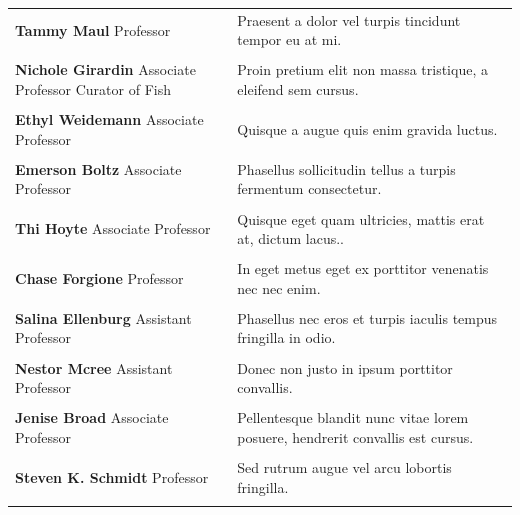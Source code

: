 \documentclass{book} %
\begin{document}
\begin{table}[ht!]
\begin{tabular}{p{2.5in} p{4.5in}}

\textbf{Tammy Maul} \newline Professor & Praesent a dolor vel turpis tincidunt tempor eu at mi.\\ \\
\textbf{Nichole Girardin} \newline Associate Professor \newline Curator of Fish & Proin pretium elit non massa tristique, a eleifend sem cursus.\\ \\
\textbf{Ethyl Weidemann} \newline Associate Professor & Quisque a augue quis enim gravida luctus.\\ \\
\textbf{Emerson Boltz} \newline Associate Professor & Phasellus sollicitudin tellus a turpis fermentum consectetur.\\ \\
\textbf{Thi Hoyte} \newline Associate Professor & Quisque eget quam ultricies, mattis erat at, dictum lacus..\\ \\
\textbf{Chase Forgione} \newline Professor & In eget metus eget ex porttitor venenatis nec nec enim.\\ \\
\textbf{Salina Ellenburg} \newline Assistant Professor & Phasellus nec eros et turpis iaculis tempus fringilla in odio.\\ \\
\textbf{Nestor Mcree} \newline Assistant Professor & Donec non justo in ipsum porttitor convallis.\\ \\
\textbf{Jenise Broad} \newline Associate Professor & Pellentesque blandit nunc vitae lorem posuere, hendrerit convallis est cursus.\\ \\
\textbf{Steven K. Schmidt} \newline Professor & Sed rutrum augue vel arcu lobortis fringilla.\\ \\

\end{tabular}
\end{table}
\end{document}
